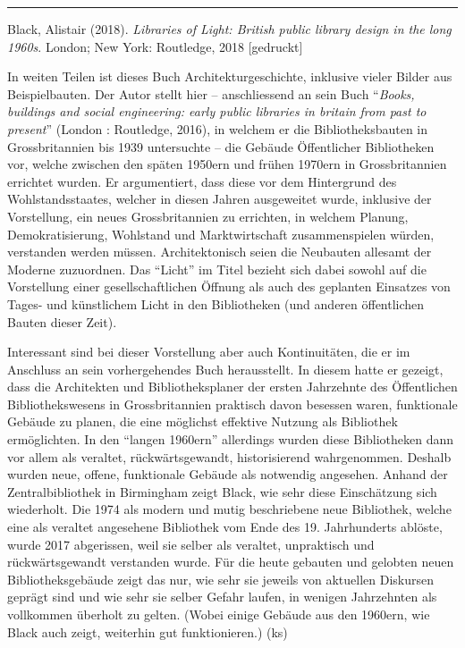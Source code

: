 \documentclass[a4paper,
fontsize=11pt,
oneside,
numbers=noperiodatend,
parskip=half-,
bibliography=totoc,
final
]{scrartcl}
\begin{document}
\begin{center}\rule{0.5\linewidth}{0.5pt}\end{center}

Black, Alistair (2018). \emph{Libraries of Light: British public library
design in the long 1960s}. London; New York: Routledge, 2018
{[}gedruckt{]}

In weiten Teilen ist dieses Buch Architekturgeschichte, inklusive vieler
Bilder aus Beispielbauten. Der Autor stellt hier -- anschliessend an
sein Buch \enquote{\emph{Books, buildings and social engineering: early
public libraries in britain from past to present}} (London : Routledge,
2016), in welchem er die Bibliotheksbauten in Grossbritannien bis 1939
untersuchte -- die Gebäude Öffentlicher Bibliotheken vor, welche
zwischen den späten 1950ern und frühen 1970ern in Grossbritannien
errichtet wurden. Er argumentiert, dass diese vor dem Hintergrund des
Wohlstandsstaates, welcher in diesen Jahren ausgeweitet wurde, inklusive
der Vorstellung, ein neues Grossbritannien zu errichten, in welchem
Planung, Demokratisierung, Wohlstand und Marktwirtschaft zusammenspielen
würden, verstanden werden müssen. Architektonisch seien die Neubauten
allesamt der Moderne zuzuordnen. Das \enquote{Licht} im Titel bezieht
sich dabei sowohl auf die Vorstellung einer gesellschaftlichen Öffnung
als auch des geplanten Einsatzes von Tages- und künstlichem Licht in den
Bibliotheken (und anderen öffentlichen Bauten dieser Zeit).

Interessant sind bei dieser Vorstellung aber auch Kontinuitäten, die er
im Anschluss an sein vorhergehendes Buch herausstellt. In diesem hatte
er gezeigt, dass die Architekten und Bibliotheksplaner der ersten
Jahrzehnte des Öffentlichen Bibliothekswesens in Grossbritannien
praktisch davon besessen waren, funktionale Gebäude zu planen, die eine
möglichst effektive Nutzung als Bibliothek ermöglichten. In den
\enquote{langen 1960ern} allerdings wurden diese Bibliotheken dann vor
allem als veraltet, rückwärtsgewandt, historisierend wahrgenommen.
Deshalb wurden neue, offene, funktionale Gebäude als notwendig
angesehen. Anhand der Zentralbibliothek in Birmingham zeigt Black, wie
sehr diese Einschätzung sich wiederholt. Die 1974 als modern und mutig
beschriebene neue Bibliothek, welche eine als veraltet angesehene
Bibliothek vom Ende des 19. Jahrhunderts ablöste, wurde 2017 abgerissen,
weil sie selber als veraltet, unpraktisch und rückwärtsgewandt
verstanden wurde. Für die heute gebauten und gelobten neuen
Bibliotheksgebäude zeigt das nur, wie sehr sie jeweils von aktuellen
Diskursen geprägt sind und wie sehr sie selber Gefahr laufen, in wenigen
Jahrzehnten als vollkommen überholt zu gelten. (Wobei einige Gebäude aus
den 1960ern, wie Black auch zeigt, weiterhin gut funktionieren.) (ks)
\end{document}
